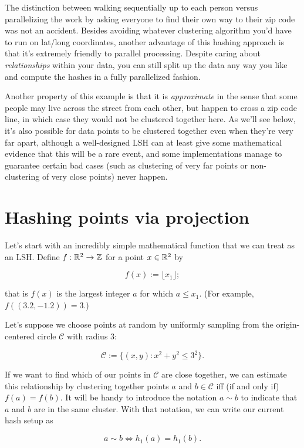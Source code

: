 \documentclass[20pt,]{extarticle}
\begin{document}
The distinction between walking sequentially up to each person versus
parallelizing the work by asking everyone to find their own way to their
zip code was not an accident. Besides avoiding whatever clustering
algorithm you'd have to run on lat/long coordinates, another advantage
of this hashing approach is that it's extremely friendly to parallel
processing. Despite caring about \emph{relationships} within your data,
you can still split up the data any way you like and compute the hashes
in a fully parallelized fashion.

Another property of this example is that it is \emph{approximate} in the
sense that some people may live across the street from each other, but
happen to cross a zip code line, in which case they would not be
clustered together here. As we'll see below, it's also possible for data
points to be clustered together even when they're very far apart,
although a well-designed LSH can at least give some mathematical
evidence that this will be a rare event, and some implementations manage
to guarantee certain bad cases (such as clustering of very far points or
non-clustering of very close points) never happen.

\section{Hashing points via
projection}\label{hashing-points-via-projection}

Let's start with an incredibly simple mathematical function that we can
treat as an LSH. Define \(f:\mathbb{R}^2 \to \mathbb{Z}\) for a point \(x\in\mathbb{R}^2\) by

\[ f(x) := \lfloor x_1 \rfloor; \]

that is \(f(x)\) is the largest integer \(a\) for which \(a\le x_1.\)
(For example, \(f((3.2, -1.2)) = 3.\))

Let's suppose we choose points at random by uniformly sampling from the
origin-centered circle \(\mathcal C\) with radius 3:

\[ \mathcal C := \{ (x, y) : x^2 + y^2 \le 3^2 \}. \]

If we want to find which of our points in \(\mathcal C\) are close
together, we can estimate this relationship by clustering together
points \(a\) and \(b \in \mathcal C\) iff (if and only if)
\(f(a) = f(b).\) It will be handy to introduce the notation \(a \sim b\)
to indicate that \(a\) and \(b\) are in the same cluster. With that
notation, we can write our current hash setup as

\[ a \sim b \iff h_1(a) = h_1(b). \]
\end{document}
